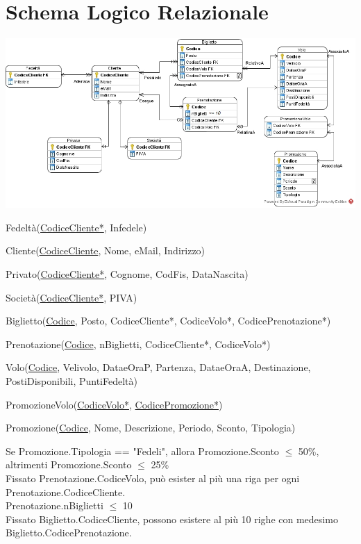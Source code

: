 \documentclass[10pt]{article}
\begin{document}
\section{Schema Logico Relazionale}
\begin{center}
\includegraphics[scale=0.56]{LogicoRelazionale_FlyAway.jpg}
\end{center}
\begin{list}{}{}
	\item Fedeltà(\underline{CodiceCliente*}, Infedele)
	\item Cliente(\underline{CodiceCliente}, Nome, eMail, Indirizzo)
	\item Privato(\underline{CodiceCliente*}, Cognome, CodFis, DataNascita)
	\item Società(\underline{CodiceCliente*}, PIVA)
	\item Biglietto(\underline{Codice}, Posto, CodiceCliente*, CodiceVolo*, CodicePrenotazione*)
	\item Prenotazione(\underline{Codice}, nBiglietti, CodiceCliente*, CodiceVolo*)
	\item Volo(\underline{Codice}, Velivolo, DataeOraP, Partenza, DataeOraA, Destinazione, PostiDisponibili, PuntiFedeltà)
	\item PromozioneVolo(\underline{CodiceVolo*}, \underline{CodicePromozione*})
	\item Promozione(\underline{Codice}, Nome, Descrizione, Periodo, Sconto, Tipologia)
\end{list}
Se Promozione.Tipologia == "Fedeli", allora Promozione.Sconto $\leq$ 50\%, altrimenti Promozione.Sconto $\leq$ 25\%\\
Fissato Prenotazione.CodiceVolo, può esister al più una riga per ogni Prenotazione.CodiceCliente.\\
Prenotazione.nBiglietti $\leq$ 10\\
Fissato Biglietto.CodiceCliente, possono esistere al più 10 righe con medesimo Biglietto.CodicePrenotazione.\\\\
\end{document}
